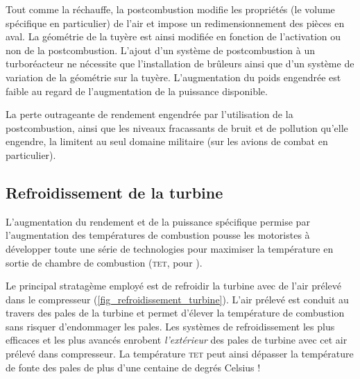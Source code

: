 		Tout comme la réchauffe, la postcombustion modifie les propriétés (le volume spécifique en particulier) de l’air et impose un redimensionnement des pièces en aval. La géométrie de la tuyère est ainsi modifiée en fonction de l’activation ou non de la postcombustion. L’ajout d’un système de postcombustion à un turboréacteur ne nécessite que l'installation de brûleurs ainsi que d’un système de variation de la géométrie sur la tuyère. L’augmentation du poids engendrée est faible au regard de l’augmentation de la puissance disponible.

		La perte outrageante de rendement engendrée par l’utilisation de la postcombustion, ainsi que les niveaux fracassants de bruit et de pollution qu’elle engendre, la limitent au seul domaine militaire (sur les avions de combat en particulier).

		 

	\subsection{Refroidissement de la turbine}
	\label{ch_refroidissement_turbine}

		L’augmentation du rendement et de la puissance spécifique permise par l’augmentation des températures de combustion pousse les motoristes à développer toute une série de technologies pour maximiser la température en sortie de chambre de combustion (\textsc{tet}, pour ).

		Le principal stratagème employé est de refroidir la turbine avec de l’air prélevé dans le compresseur (\cref{fig_refroidissement_turbine}). L’air prélevé est conduit au travers des pales de la turbine et permet d’élever la température de combustion sans risquer d’endommager les pales. Les systèmes de refroidissement les plus efficaces et les plus avancés enrobent \emph{l’extérieur} des pales de turbine avec cet air prélevé dans compresseur. La température \textsc{tet} peut ainsi dépasser la température de fonte des pales de plus d’une centaine de degrés Celsius !

